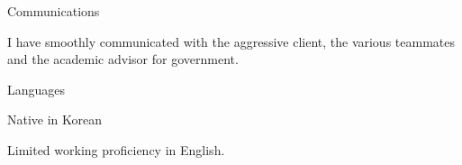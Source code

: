 \begin{cvskills}
  \cvskill
    {Communications} %
    {
      \begin{cvitems}
      \item {I have smoothly communicated with the aggressive client, the various teammates and the academic advisor for government.}
      \end{cvitems}
    } %

  \cvskill
    {Languages} %
    {
      \begin{cvitems}
        \item {Native in Korean}
        \item {Limited working proficiency in English.}
      \end{cvitems}
    } %

\end{cvskills}
